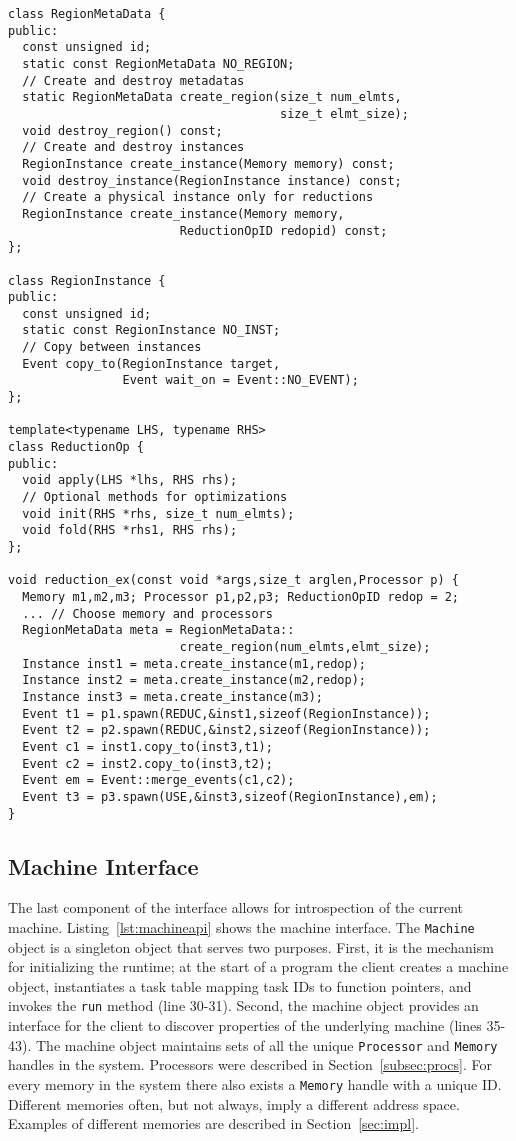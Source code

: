 \begin{lstlisting}[float={t},label={lst:regionapi},caption={Physical Region Interface and Example.}]
class RegionMetaData {
public:
  const unsigned id;
  static const RegionMetaData NO_REGION;
  // Create and destroy metadatas
  static RegionMetaData create_region(size_t num_elmts, 
                                      size_t elmt_size);
  void destroy_region() const;
  // Create and destroy instances
  RegionInstance create_instance(Memory memory) const;
  void destroy_instance(RegionInstance instance) const;
  // Create a physical instance only for reductions
  RegionInstance create_instance(Memory memory, 
                        ReductionOpID redopid) const;
};

class RegionInstance {
public:
  const unsigned id;
  static const RegionInstance NO_INST;
  // Copy between instances
  Event copy_to(RegionInstance target, 
                Event wait_on = Event::NO_EVENT);
};

template<typename LHS, typename RHS>
class ReductionOp {
public:
  void apply(LHS *lhs, RHS rhs);
  // Optional methods for optimizations
  void init(RHS *rhs, size_t num_elmts);
  void fold(RHS *rhs1, RHS rhs);
};

void reduction_ex(const void *args,size_t arglen,Processor p) {
  Memory m1,m2,m3; Processor p1,p2,p3; ReductionOpID redop = 2;
  ... // Choose memory and processors
  RegionMetaData meta = RegionMetaData::
                        create_region(num_elmts,elmt_size);
  Instance inst1 = meta.create_instance(m1,redop);
  Instance inst2 = meta.create_instance(m2,redop);
  Instance inst3 = meta.create_instance(m3);
  Event t1 = p1.spawn(REDUC,&inst1,sizeof(RegionInstance));
  Event t2 = p2.spawn(REDUC,&inst2,sizeof(RegionInstance));
  Event c1 = inst1.copy_to(inst3,t1);
  Event c2 = inst2.copy_to(inst3,t2);
  Event em = Event::merge_events(c1,c2);
  Event t3 = p3.spawn(USE,&inst3,sizeof(RegionInstance),em);
}
\end{lstlisting}


\subsection{Machine Interface}
\label{subsec:machmodel}
The last component of the interface allows for introspection of the current machine.
Listing~\ref{lst:machineapi} shows the machine interface.
The {\tt Machine} object is a singleton object that serves two purposes.  First, it
is the mechanism for initializing the runtime; at the start of a program the client 
creates a machine object, instantiates a task table mapping task IDs to function pointers,
and invokes the {\tt run} method (line 30-31).
Second, the machine object provides an interface for the client to 
discover properties of the underlying machine (lines 35-43).  The machine object maintains
sets of all the unique {\tt Processor} and {\tt Memory} handles in the system.  Processors
were described in Section~\ref{subsec:procs}.  For every memory in the system there also 
exists a {\tt Memory} handle with a unique ID.  Different memories often, but not always, 
imply a different address space.  Examples of different memories are described in
Section~\ref{sec:impl}.

